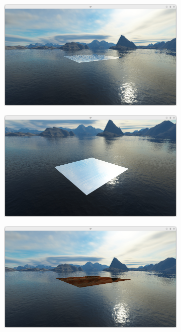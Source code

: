 \documentclass{article}
\begin{document}
\begin{figure}[h]
     \centering
     \begin{subfigure}[b]{0.49\textwidth}
         \centering
         \includegraphics[width=\textwidth]{images/renduReflectif1.png}
     \end{subfigure}
     \hfill
     \begin{subfigure}[b]{0.49\textwidth}
         \centering
         \includegraphics[width=\textwidth]{images/renduReflectif2.png}
     \end{subfigure}
     \hfill
     \begin{subfigure}[b]{0.49\textwidth}
         \centering
         \includegraphics[width=\textwidth]{images/bizarrie1.png}

\end{subfigure}
\end{figure}
\end{document}
